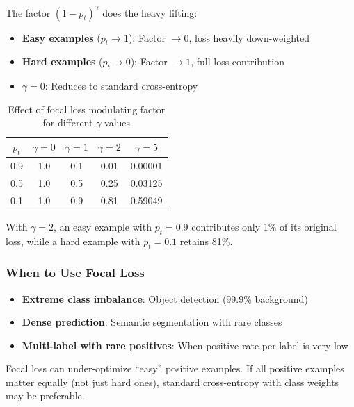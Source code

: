 The factor $(1-p_t)^\gamma$ does the heavy lifting:

\begin{itemize}
    \item \textbf{Easy examples} ($p_t \to 1$): Factor $\to 0$, loss heavily down-weighted
    \item \textbf{Hard examples} ($p_t \to 0$): Factor $\to 1$, full loss contribution
    \item \textbf{$\gamma = 0$}: Reduces to standard cross-entropy
\end{itemize}

\begin{table}[H]
\centering
\caption{Effect of focal loss modulating factor for different $\gamma$ values}
\begin{tabular}{c|cccc}
\toprule
$p_t$ & $\gamma=0$ & $\gamma=1$ & $\gamma=2$ & $\gamma=5$ \\
\midrule
0.9 & 1.0 & 0.1 & 0.01 & 0.00001 \\
0.5 & 1.0 & 0.5 & 0.25 & 0.03125 \\
0.1 & 1.0 & 0.9 & 0.81 & 0.59049 \\
\bottomrule
\end{tabular}
\end{table}

With $\gamma = 2$, an easy example with $p_t = 0.9$ contributes only 1\% of its original loss, while a hard example with $p_t = 0.1$ retains 81\%.

\subsubsection{When to Use Focal Loss}

\begin{itemize}
    \item \textbf{Extreme class imbalance}: Object detection (99.9\% background)
    \item \textbf{Dense prediction}: Semantic segmentation with rare classes
    \item \textbf{Multi-label with rare positives}: When positive rate per label is very low
\end{itemize}

\begin{warningbox}
Focal loss can under-optimize ``easy'' positive examples. If all positive examples matter equally (not just hard ones), standard cross-entropy with class weights may be preferable.
\end{warningbox}

